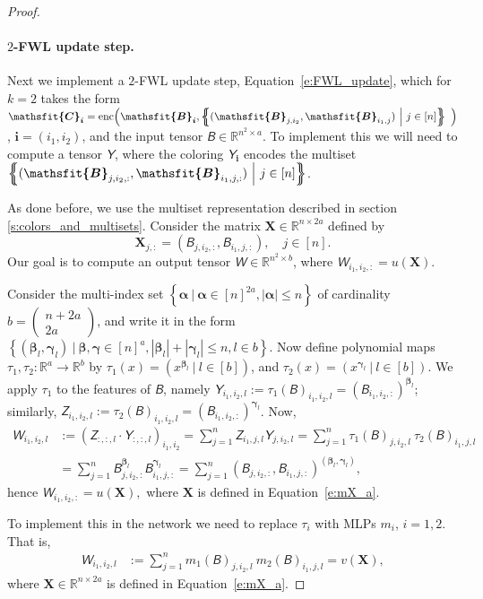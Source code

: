 \documentclass{article}
\newcommand{\abs}[1]{\left\vert#1\right\vert}
\newcommand{\set}[1]{\left\{#1\right\}}
\newcommand{\mset}[1]{\left\{\kern-.5em\left\{ #1 \right\}\kern-.5em\right\}}
\newcommand{\Real}{\mathbb R}
\newcommand{\too}{\rightarrow}
\def\Eqref#1{Equation~\ref{#1}}
\def\vi{{\bm{i}}}
\def\valpha{{\bm{\alpha}}}
\def\vbeta{{\bm{\beta}}}
\def\vgamma{{\bm{\gamma}}}
\def\mX{{\bm{X}}}
\newcommand{\tens}[1]{\bm{\mathsfit{#1}}}
\def\tB{{\tens{B}}}
\def\tC{{\tens{C}}}
\def\tW{{\tens{W}}}
\def\tY{{\tens{Y}}}
\def\tZ{{\tens{Z}}}
\begin{document}
\begin{proof}
\paragraph{$2$-FWL update step.}
Next we implement a $2$-FWL update step, \Eqref{e:FWL_update}, which for $k=2$ takes the form $\tC_\vi = \mathrm{enc}\Big( \tB_\vi , \mset{ (\tB_{j,i_2},\tB_{i_1,j}) \ \Big \vert \ j\in [n] } \ \Big)$, $\vi=(i_1,i_2)$, and the input tensor $\tB\in\Real^{n^2\times a}$. To implement this we will need to compute a tensor $\tY$, where the coloring $\tY_\vi$ encodes the multiset $\mset{ (\tB_{j,i_2,:},\tB_{i_1,j,:}) \ \Big \vert \ j\in [n] }$. 

As done before, we use the multiset representation described in section \ref{s:colors_and_multisets}. Consider the matrix $\mX\in\Real^{n \times 2a}$ defined by
\begin{equation}\label{e:mX_a}
 \mX_{j,:}=(\tB_{j,i_2,:},\tB_{i_1,j,:}), \quad j\in [n].
\end{equation}
Our goal is to compute an output tensor $\tW\in\Real^{n^2\times b}$, where $\tW_{i_1,i_2,:} = u(\mX)$. 

Consider the multi-index set $\set{\valpha \ \vert \ \valpha\in [n]^{2a},  \abs{\valpha}\leq n}$ of cardinality $b=\left(\begin{smallmatrix}n+2a\\ 2a\end{smallmatrix}\right)$, and write it in the form $\set{(\vbeta_l,\vgamma_l) \ \vert \ \vbeta,\vgamma\in [n]^a , \abs{\vbeta_l}+\abs{\vgamma_l} \leq n, l\in b}$. Now define polynomial maps $\tau_1,\tau_2 : \Real^a \too \Real^b$ by $\tau_1(x)=(x^{\vbeta_l} \ \vert \ l\in [b])$, and $\tau_2(x)=(x^{\vgamma_l}\ \vert \ l\in [b])$. We apply $\tau_1$ to the features of $\tB$, namely $\tY_{i_1,i_2,l}:=\tau_1(\tB)_{i_1,i_2,l}=(\tB_{i_1,i_2,:})^{\vbeta_l}$; similarly, $\tZ_{i_1,i_2,l}:=\tau_2(\tB)_{i_1,i_2,l}=(\tB_{i_1,i_2,:})^{\vgamma_l}$. Now,
\begin{align*}
  \tW_{i_1,i_2,l} &:=(\tZ_{:,:,l} \cdot \tY_{:,:,l})_{i_1,i_2} = \sum_{j=1}^n \tZ_{i_1,j,l} \tY_{j,i_2, l}=\sum_{j=1}^n \tau_1(\tB)_{j,i_2,l}\  \tau_2(\tB)_{i_1,j,l}  \\&= 
\sum_{j=1}^n \tB_{j,i_2,:}^{\vbeta_l} \tB_{i_1,j,:}^{\vgamma_l}=
\sum_{j=1}^n (\tB_{j,i_2,:},\tB_{i_1,j,:})^{(\vbeta_l,\vgamma_l)},  
\end{align*}
hence
$\tW_{i_1,i_2,:} = u(\mX),$ 
where $\mX$ is defined in \Eqref{e:mX_a}. 

To implement this in the network we need to replace $\tau_i$ with MLPs $m_i$, $i=1,2$. That is, 
\begin{align}\label{e:m1_m2}
  \tW_{i_1,i_2,l} &:= \sum_{j=1}^n m_1(\tB)_{j,i_2,l}\  m_2(\tB)_{i_1,j,l} = v(\mX),
\end{align}
where $\mX\in\Real^{n\times 2a}$ is defined in \Eqref{e:mX_a}.


\end{proof}
\end{document}
